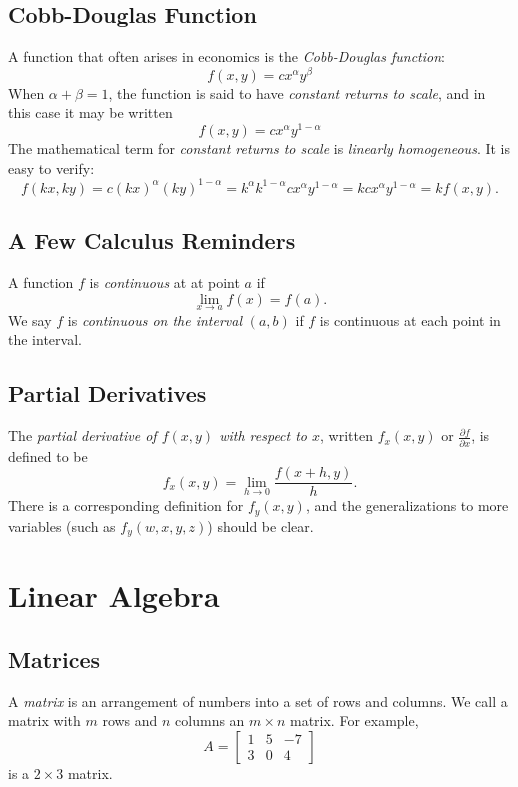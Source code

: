 \documentclass[reqno]{immbook}
\numberwithin{equation}{chapter}
\numberwithin{question}{section}
\numberwithin{theorem}{chapter}
\numberwithin{figure}{chapter}
\theoremstyle{definition}
\begin{document}
\section{Cobb-Douglas Function}
%
\label{sec:cobbdouglas}
A function that often arises in economics
is the \emph{Cobb-Douglas function}:
\begin{equation}
  f(x,y) = cx^{\alpha}y^{\beta}
\end{equation}
When $\alpha+\beta=1$, the function is said to have
\emph{constant returns to scale},
and in this case it may
be written
\begin{equation}
  f(x,y) = cx^{\alpha}y^{1-\alpha}
\end{equation}
The mathematical term for \emph{constant returns to scale}
is \emph{linearly homogeneous}.
It is easy to verify:
\begin{equation}
  f(kx,ky) = c(kx)^{\alpha}(ky)^{1-\alpha}
     = k^{\alpha}k^{1-\alpha} c x^{\alpha}y^{1-\alpha}
     = k c x^{\alpha}y^{1-\alpha}
     = k f(x,y).
\end{equation}
%
\section{A Few Calculus Reminders}

A function $f$ is \emph{continuous} at at point $a$ if
\[
  \lim_{x\rightarrow a} f(x) = f(a).
\]
%
We say $f$ is \emph{continuous on the interval} $(a,b)$ if
$f$ is continuous at each point in the interval.
%
\section{Partial Derivatives}
\label{sec:PartialDerivs}
The \emph{partial derivative of $f(x,y)$ with respect to $x$},
written $f_x(x,y)$ or $\frac{\partial f}{\partial x}$, is
defined to be
\[
   f_x(x,y) = \lim_{h\rightarrow 0} \frac{f(x+h,y)}{h}.
\]
There is a corresponding definition for $f_y(x,y)$,
and the generalizations to more variables
(such as $f_y(w,x,y,z)$) should be clear.
%
%
\chapter{Linear Algebra}
%
\section{Matrices}
A \emph{matrix} is an arrangement of numbers into
a set of rows and columns.  We call a matrix with
$m$ rows and $n$ columns an $m\times n$ matrix.
For example,
\[
   A = \begin{bmatrix}
           1 & 5 & -7 \\ 3 & 0 & 4
       \end{bmatrix}
\]
is a $2\times 3$ matrix.
%
\end{document}
